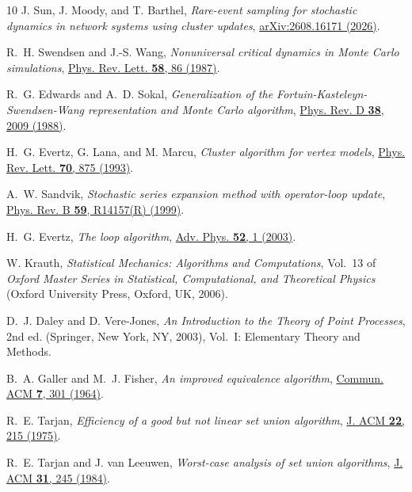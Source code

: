 \documentclass[english,10pt,aps,pra,twocolumn,superscriptaddress,floatfix,fleqn]{revtex4-2}
\begin{document}
\begin{thebibliography}{10}
J. Sun, J. Moody, and T. Barthel, {\em Rare-event sampling for stochastic
  dynamics in network systems using cluster updates},
  \href{http://arxiv.org/abs/2608.16171} {arXiv:2608.16171  (2026)}.

R.~H. Swendsen and J.-S. Wang, {\em Nonuniversal critical dynamics in Monte
  Carlo simulations}, \href{http://dx.doi.org/10.1103/PhysRevLett.58.86} {Phys.
  Rev. Lett. {\bf 58},  86  (1987)}.

R.~G. Edwards and A.~D. Sokal, {\em Generalization of the
  Fortuin-Kasteleyn-Swendsen-Wang representation and Monte Carlo algorithm},
  \href{http://dx.doi.org/10.1103/PhysRevD.38.2009} {Phys. Rev. D {\bf 38},
  2009  (1988)}.

H.~G. Evertz, G. Lana, and M. Marcu, {\em Cluster algorithm for vertex models},
  \href{http://dx.doi.org/10.1103/PhysRevLett.70.875} {Phys. Rev. Lett. {\bf
  70},  875  (1993)}.

A.~W. Sandvik, {\em Stochastic series expansion method with operator-loop
  update}, \href{http://dx.doi.org/10.1103/PhysRevB.59.R14157} {Phys. Rev. B
  {\bf 59},  R14157(R)  (1999)}.

H.~G. Evertz, {\em The loop algorithm},
  \href{http://dx.doi.org/10.1080/0001873021000049195} {Adv. Phys. {\bf 52},  1
   (2003)}.

W. Krauth, {\em Statistical Mechanics: Algorithms and Computations}, Vol.~13 of
  {\em Oxford Master Series in Statistical, Computational, and Theoretical
  Physics} (Oxford University Press, Oxford, UK, 2006).

D.~J. Daley and D. Vere-Jones, {\em An Introduction to the Theory of Point
  Processes}, 2nd ed. (Springer, New York, NY, 2003), Vol.~I: Elementary Theory
  and Methods.

B.~A. Galler and M.~J. Fisher, {\em An improved equivalence algorithm},
  \href{http://dx.doi.org/10.1145/364099.364331} {Commun. ACM {\bf 7},  301
  (1964)}.

R.~E. Tarjan, {\em Efficiency of a good but not linear set union algorithm},
  \href{http://dx.doi.org/10.1145/321879.321884} {J. ACM {\bf 22},  215
  (1975)}.

R.~E. Tarjan and J. van Leeuwen, {\em Worst-case analysis of set union
  algorithms}, \href{http://dx.doi.org/10.1145/62.2160} {J. ACM {\bf 31},  245
  (1984)}.


\end{thebibliography}
\end{document}
